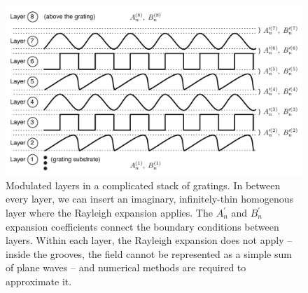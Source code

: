 \begin{figure}[p] %
   \centering
   \includegraphics[scale=0.5]{../data/Chapter2/2d_stacksOfGratings/2d_2.pdf} 
   \caption[Modulated layers in a complicated stack of gratings.  In between every layer, we can insert an imaginary, infinitely-thin homogenous layer where the Rayleigh expansion applies.]{Modulated layers in a complicated stack of gratings.  In between every layer, we can insert an imaginary, infinitely-thin homogenous layer where the Rayleigh expansion applies.  The $A^{\prime}_n$ and $B^{\prime}_n$ expansion coefficients connect the boundary conditions between layers.  Within each layer, the Rayleigh expansion does not apply -- inside the grooves, the field cannot be represented as a simple sum of plane waves -- and numerical methods are required to approximate it.}
   \label{2d-2}
\end{figure}

